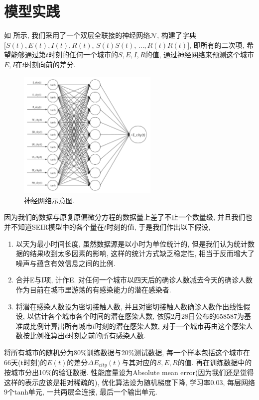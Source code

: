 \documentclass[lang=cn,11pt]{elegantpaper}
\begin{document}
\section{模型实践}

如 所示, 我们采用了一个双层全联接的神经网络$\mathcal N$, 构建了字典$[S(t),E(t),I(t),R(t)$, $S(t)S(t)$, $...,R(t)R(t)]$, 即所有的二次项, 希望能够通过第$t$时刻的任何一个城市的$S,E,I,R$的值, 通过神经网络来预测这个城市$E,I$在$t$时刻向前的差分. 

\begin{figure}[htbp]
  \centering
  \hspace{50pt}\includegraphics[width=0.6\textwidth]{sjwl}
  \caption{神经网络示意图. \label{fig:sjwl}}
\end{figure}

因为我们的数据与原复原偏微分方程的数据量上差了不止一个数量级, 并且我们也并不知道SEIR模型中的各个量在$t$时刻的值, 于是我们作出以下假设, 
\begin{enumerate}
	\item 以天为最小时间长度, 虽然数据源是以小时为单位统计的, 但是我们认为统计数据的结果收到太多因素的影响, 这样的统计方式缺乏稳定性, 相当于反而增大了噪声与蕴含有效信息之间的比例.
	\item 合并E与I项, 计作E. 对任何一个城市以四天后的确诊人数减去今天的确诊人数作为目前在城市里游荡的有感染能力的潜在感染者.
	\item 将潜在感染人数设为密切接触人数, 并且对密切接触人数确诊人数作出线性假设, 以估计各个城市各个时间的潜在感染人数, 依照2月28日公布的658587为基准成比例计算出所有城市$t$时刻的潜在感染人数, 对于一个城市再由这个感染人数按比例推算出$t$时刻之前的所有感染人数. 
\end{enumerate}

将所有城市的随机分为80\%训练数据与20\%测试数据, 每一个样本包括这个城市在66天(t时刻)的$E(t)$的差分$\Delta E_{city}(t)$与其对应的$S,E,R$的值. 再在训练数据中的按城市分出10\%的验证数据. 性能度量设为Absolute mean error(因为我们还是觉得这样的表示应该是相对稀疏的), 优化算法设为随机梯度下降, 学习率0.03, 每层网络9个tanh单元, 一共两层全连接, 最后一个输出单元.
\end{document}
